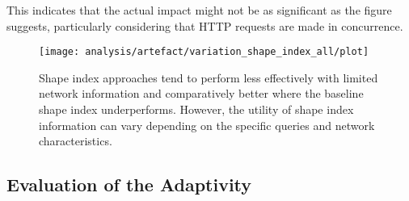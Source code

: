 This indicates that the actual impact might not be as significant as the figure suggests, particularly considering that HTTP requests are made in concurrence.



\begin{figure}[h]
    \centering
    \texttt{[image: analysis/artefact/variation\_shape\_index\_all/plot]}
    \caption{
    Shape index approaches tend to perform less effectively with limited network information and comparatively better where the baseline shape index underperforms.
    However, the utility of shape index information can vary depending on the specific queries and network characteristics.
    }
    \label{fig:adaptShapeIndex}
\end{figure}

\subsection{Evaluation of the Adaptivity}

